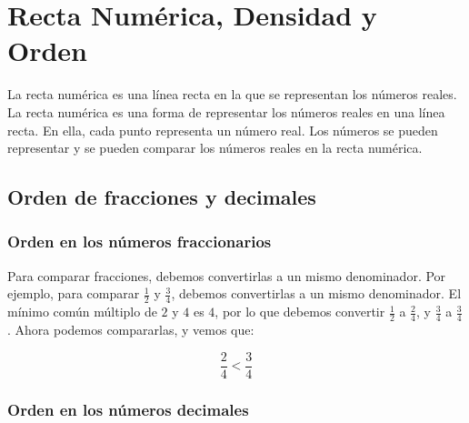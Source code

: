 \thispagestyle{plain}
\section{Recta Num\'erica, Densidad y Orden}
La recta numérica es una línea recta en la que se representan los números reales. La recta numérica es una forma de representar los números reales en una línea recta. En ella, cada punto representa un número real. Los números se pueden representar y se pueden comparar los números reales en la recta numérica.

\subsection{Orden de fracciones y decimales}

\subsubsection{Orden en los n\'umeros fraccionarios}
Para comparar fracciones, debemos convertirlas a un mismo denominador. Por ejemplo, para comparar $\frac{1}{2}$ y $\frac{3}{4}$, debemos convertirlas a un mismo denominador. El mínimo común múltiplo de $2$ y $4$ es $4$, por lo que debemos convertir $\frac{1}{2}$ a $\frac{2}{4}$, y $\frac{3}{4}$ a $\frac{3}{4}$. Ahora podemos compararlas, y vemos que:

\[\frac{2}{4}<\frac{3}{4}\]

\begin{center}
\end{center}

\subsubsection{Orden en los n\'umeros decimales}

